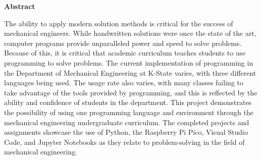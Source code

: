 \begin{flushleft}
    \Large
    \textbf{Abstract}
    \normalsize
    \thispagestyle{empty}
\end{flushleft}

The ability to apply modern solution methods is critical for the success
of mechanical engineers. While handwritten solutions were once the 
state of the art, computer programs provide unparalleled power and speed 
to solve problems. Because of this, it is critical that academic 
curriculum teaches students to use programming to solve problems.
The current implementation of programming in the Department of Mechanical Engineering at K-State varies,
with three different languages being used. The usage rate also varies,
with many classes failing to take advantage of the tools provided by
programming, and this is reflected by the ability and confidence of
students in the department.
This project demonstrates the possibility of using one programming 
language and environment through the mechanical engineering
undergraduate curriculum. The completed projects and assignments
showcase the use of Python, the Raspberry Pi Pico, Visual
Studio Code, and Jupyter Notebooks as they relate to problem-solving
in the field of mechanical engineering.
